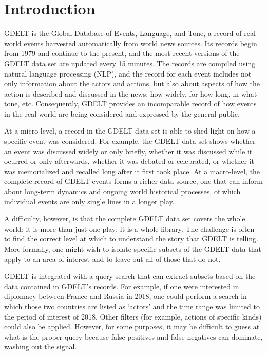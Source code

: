 
\chapter{Introduction} \label{chap:Introduction}
\par GDELT is the Global Database of Events, Language, and Tone, a record of real-world events  harvested automatically from world news sources. Its records begin from 1979 and continue to the present, and the most recent versions of the GDELT data set are updated every 15 minutes. The records are compiled using natural language processing (NLP), and the record for each event includes not only information about the actors and actions, but also about aspects of how the action is described and discussed in the news: how widely, for how long, in what tone, etc. Consequently, GDELT provides an incomparable record of how events in the real world are being considered and expressed by the general public.

\par At a micro-level, a record in the GDELT data set is able to shed light on how a specific event was considered. For example, the GDELT data set shows whether an event was discussed widely or only briefly, whether it was discussed while it ocurred or only afterwards, whether it was debated or celebrated, or whether it was memorialized and recalled long after it first took place. At a macro-level, the complete record of GDELT events forms a richer data source, one that can inform about long-term dynamics and ongoing world historical processes, of which individual events are only single lines in a longer play.

\par A difficulty, however, is that the complete GDELT data set covers the whole world: it is more than just one play; it is a whole library. The challenge is often to find the correct level at which to understand the story that GDELT is telling. More formally, one might wish to isolate specific subsets of the GDELT data that apply to an area of interest and to leave out all of those that do not.

\par GDELT is integrated with a query search that can extract subsets based on the data contained in GDELT's records. For example, if one were interested in diplomacy between France and Russia in 2018, one could perform a search in which those two countries are listed as `actors' and the time range was limited to the period of interest of 2018. Other filters (for example, actions of specific kinds) could also be applied. However, for some purposes, it may be difficult to guess at what is the proper query because false positives and false negatives can dominate, washing out the signal.

